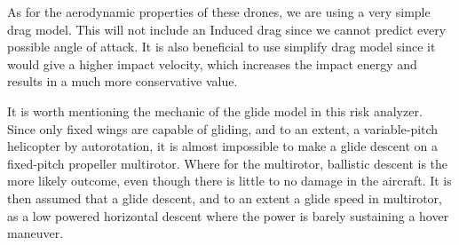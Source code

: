 \documentclass[12pt]{report}
\begin{document}
        As for the aerodynamic properties of these drones, we are using a very simple drag model. This will not include
        an Induced drag since we cannot predict every possible angle of attack. It is also beneficial to use simplify
        drag model since it would give a higher impact velocity, which increases the impact energy and results in a much
        more conservative value.
            
        It is worth mentioning the mechanic of the glide model in this risk analyzer. Since only fixed wings are capable
        of gliding, and to an extent, a variable-pitch helicopter by autorotation, it is almost impossible to make a
        glide descent on a fixed-pitch propeller multirotor. Where for the multirotor, ballistic descent is the more
        likely outcome, even though there is little to no damage in the aircraft. It is then assumed that a glide
        descent, and to an extent a glide speed in multirotor, as a low powered horizontal descent where the power is
        barely sustaining a hover maneuver.
\end{document}
